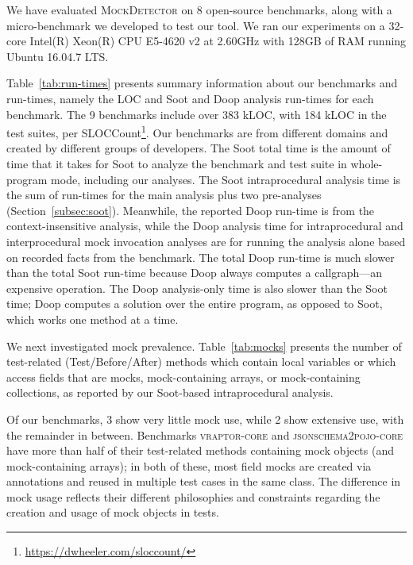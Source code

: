 We have evaluated \textsc{MockDetector} on 8 open-source benchmarks, along with a micro-benchmark we developed to test our tool. We ran our experiments on a 32-core Intel(R) Xeon(R) CPU E5-4620 v2 at 2.60GHz with 128GB of RAM running Ubuntu 16.04.7 LTS.

Table~\ref{tab:run-times} presents summary information about our benchmarks and run-times, namely the LOC and Soot and Doop analysis run-times for each benchmark. The 9 benchmarks include over 383 kLOC, with 184 kLOC in the test suites, per SLOCCount\footnote{\url{https://dwheeler.com/sloccount/}}.  Our benchmarks are from different domains and created by different groups of developers. The Soot total time is the amount of time that it takes for Soot to analyze the benchmark and test suite in whole-program mode, including our analyses. The Soot intraprocedural analysis time is the sum of run-times for the main analysis plus two pre-analyses (Section~\ref{subsec:soot}). Meanwhile, the reported Doop run-time is from the context-insensitive analysis, while the Doop analysis time for intraprocedural and interprocedural mock invocation analyses are for running the analysis alone based on recorded facts from the benchmark. The total Doop run-time is much slower than the total Soot run-time because Doop always computes a callgraph---an expensive operation. The Doop analysis-only time is also slower than the Soot time; Doop computes a solution over the entire program, as opposed to Soot, which works one method at a time.

We next investigated mock prevalence. Table~\ref{tab:mocks} presents the number of test-related (Test/Before/After) methods which contain local variables or which access fields that are mocks, mock-containing arrays, or mock-containing collections, as reported by our Soot-based intraprocedural analysis. 


Of our benchmarks, 3 show very little mock use, while 2 show extensive use, with the remainder in between. Benchmarks \textsc{vraptor-core} and \textsc{jsonschema2pojo-core} have more than half of their test-related methods containing mock objects (and mock-containing arrays); in both of these, most field mocks are created via annotations and reused in multiple test cases in the same class. The difference in mock usage reflects their different philosophies and constraints regarding the creation and usage of mock objects in tests.

